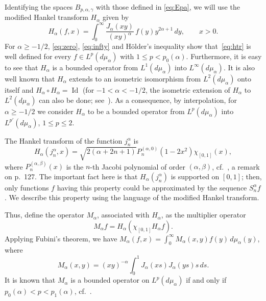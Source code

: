 \documentclass[a4paper]{amsart}
\newcommand{\iden}{\operatorname{Id}}
\newcommand{\mua}{d\mu_\alpha}
\begin{document}
Identifying the spaces $B_{p,\alpha,\gamma}$ with those defined in
\eqref{eq:Epa}, we will use the modified Hankel transform $H_{\alpha}$ given by
\begin{equation}
\label{eq:htr}
  H_{\alpha}(f,x) = \int_0^\infty \frac{J_\alpha(xy)}{(xy)^\alpha} \, f(y)
    y^{2\alpha+1} \, dy,
  \qquad x>0.
\end{equation}
For $\alpha\ge-1/2$, \eqref{eq:zero}, \eqref{eq:infty}
and H\"older's inequality show that~\eqref{eq:htr} is well defined for every
$f\in L^p(\mua)$ with $1 \le p <p_0(\alpha)$.
Furthermore, it is easy to see that $H_{\alpha}$ is a bounded
operator from $L^1(\mua)$ into $L^\infty(\mua)$.
It is also well known that $H_{\alpha}$ extends to an isometric
isomorphism from $L^2(\mua)$ onto itself and $H_{\alpha} \circ H_{\alpha} =
\iden$ (for $-1<\alpha<-1/2$,
the isometric extension of $H_{\alpha}$ to $L^2(\mua)$ can
also be done; see~\cite{Dur,BeSt}).
As a consequence, by interpolation, for $\alpha\ge-1/2$ we consider $H_{\alpha}$ to
be a bounded operator from $L^p(\mua)$ into $L^{p'}(\mua)$, $1\le p\le2$.

The Hankel transform of the function $j_n^\alpha$ is
\begin{equation*}
   H_{\alpha}(j_n^\alpha,x) = \sqrt{2(\alpha+2n+1)} P_n^{(\alpha,0)}(1-2x^2)
   \chi_{[0,1]}(x),
\end{equation*}
where $P_n^{(\alpha,\beta)}(x)$ is the $n$-th Jacobi polynomial of order
$(\alpha,\beta)$, cf.~\cite{CiGPV}, a remark on p.~127.
The important fact here is that $H_{\alpha}(j_n^\alpha)$ is supported on
$[0,1]$; then, only functions $f$ having this property could be approximated
by the sequence $S_n^\alpha f$. We describe this property using the language
of the modified Hankel transform.

Thus, define the operator $M_{\alpha}$, associated with $H_{\alpha}$, as the multiplier
operator
\begin{equation*}
  M_{\alpha} f = H_{\alpha}(\chi_{[0,1]}H_{\alpha} f).
\end{equation*}
Applying Fubini's theorem, we have
$M_\alpha (f,x) = \int_0^\infty M_\alpha(x,y)f(y)\,d\mu_\alpha(y)$,
where
\begin{equation}
\label{eq:Makernel}
  M_\alpha(x,y) = (xy)^{-\alpha} \int_0^1 J_\alpha(xs)J_\alpha(ys) s\,ds.
\end{equation}
It is known that $M_\alpha$ is a bounded operator on $L^p(\mua)$
if and only if $p_0(\alpha)<p<p_1(\alpha)$, cf.~\cite{Her,V,CiGPV-DIE,CiV,BeSt}.
\end{document}
